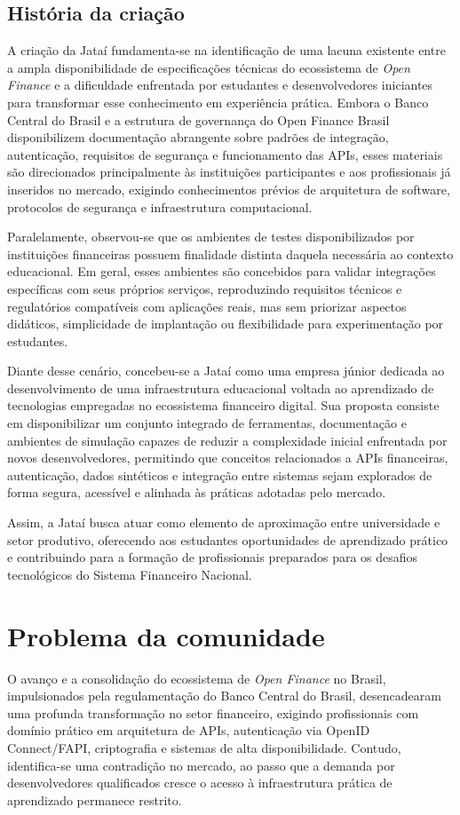 \documentclass[
  12pt,
  openright,
  oneside,
  a4paper,
  brazilian
]{abntex2}
\newcommand{\bcb}{Banco Central do Brasil}
\newcommand{\sfn}{Sistema Financeiro Nacional}
\newcommand{\openfinance}{\textit{Open Finance}}
\begin{document}
\section{História da criação}
\label{sec:historia_criacao}

A criação da Jataí fundamenta-se na identificação de uma lacuna existente entre a ampla disponibilidade de especificações técnicas do ecossistema de \openfinance{} e a dificuldade enfrentada por estudantes e desenvolvedores iniciantes para transformar esse conhecimento em experiência prática. Embora o \bcb{} e a estrutura de governança do Open Finance Brasil disponibilizem documentação abrangente sobre padrões de integração, autenticação, requisitos de segurança e funcionamento das APIs, esses materiais são direcionados principalmente às instituições participantes e aos profissionais já inseridos no mercado, exigindo conhecimentos prévios de arquitetura de software, protocolos de segurança e infraestrutura computacional.

Paralelamente, observou-se que os ambientes de testes disponibilizados por instituições financeiras possuem finalidade distinta daquela necessária ao contexto educacional. Em geral, esses ambientes são concebidos para validar integrações específicas com seus próprios serviços, reproduzindo requisitos técnicos e regulatórios compatíveis com aplicações reais, mas sem priorizar aspectos didáticos, simplicidade de implantação ou flexibilidade para experimentação por estudantes.

Diante desse cenário, concebeu-se a Jataí como uma empresa júnior dedicada ao desenvolvimento de uma infraestrutura educacional voltada ao aprendizado de tecnologias empregadas no ecossistema financeiro digital. Sua proposta consiste em disponibilizar um conjunto integrado de ferramentas, documentação e ambientes de simulação capazes de reduzir a complexidade inicial enfrentada por novos desenvolvedores, permitindo que conceitos relacionados a APIs financeiras, autenticação, dados sintéticos e integração entre sistemas sejam explorados de forma segura, acessível e alinhada às práticas adotadas pelo mercado.

Assim, a Jataí busca atuar como elemento de aproximação entre universidade e setor produtivo, oferecendo aos estudantes oportunidades de aprendizado prático e contribuindo para a formação de profissionais preparados para os desafios tecnológicos do \sfn{}.

\chapter{Problema da comunidade}
\label{cap:problema_comunidade}
O avanço e a consolidação do ecossistema de \openfinance{} no Brasil, impulsionados pela regulamentação do \bcb{}, desencadearam uma profunda transformação no setor financeiro, exigindo profissionais com domínio prático em arquitetura de APIs, autenticação via OpenID Connect/FAPI, criptografia e sistemas de alta disponibilidade. Contudo, identifica-se uma contradição no mercado, ao passo que a demanda por desenvolvedores qualificados cresce o acesso à infraestrutura prática de aprendizado permanece restrito. 
\end{document}
